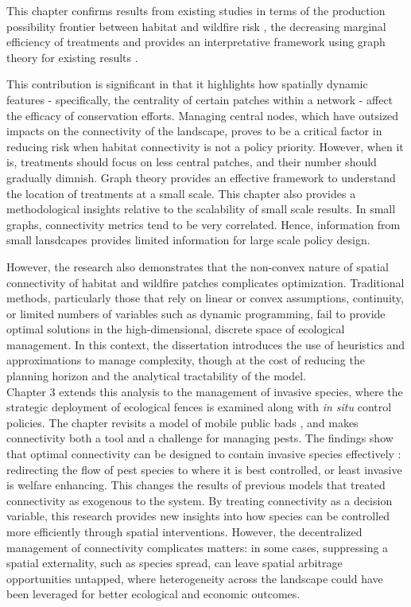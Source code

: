 This chapter confirms results from existing studies in terms of the production possibility frontier between habitat and wildfire risk \citep{calkin_modeling_2005}, the decreasing marginal efficiency of treatments \citep{wei_optimization_2008, yemshanov_exploring_2022} and provides an interpretative framework using graph theory for existing results \citep{minas_spatial_2014,
rachmawati_optimisation_2016,
konoshima_spatial-endogenous_2008, yemshanov_detecting_2021}. 

This contribution is significant in that it highlights how spatially dynamic features - specifically, the centrality of certain patches within a network - affect the efficacy of conservation efforts. Managing central nodes, which have outsized impacts on the connectivity of the landscape, proves to be a critical factor in reducing risk when habitat connectivity is not a policy priority. However, when it is, treatments should focus on less central patches, and their number should gradually dimnish. Graph theory provides an effective framework to understand the location of treatments at a small scale. This chapter also provides a methodological insights relative to the scalability of small scale results. In small graphs, connectivity metrics tend to be very correlated. Hence, information from small lansdcapes provides limited information for large scale policy design. 

However, the research also demonstrates that the non-convex nature of spatial connectivity of habitat and wildfire patches  complicates optimization. Traditional methods, particularly those that rely on linear or convex assumptions, continuity, or limited numbers of variables such as dynamic programming, fail to provide optimal solutions in the high-dimensional, discrete space of ecological management. In this context, the dissertation introduces the use of heuristics and approximations to manage complexity, though at the cost of reducing the planning horizon and the analytical tractability of the model.\\

Chapter 3 extends this analysis to the management of invasive species, where the strategic deployment of ecological fences is examined along with \textit{in situ} control policies. The chapter revisits a model of mobile public bads \citep{costello_private_2017}, and makes connectivity both a tool and a challenge for managing pests. The findings show that optimal connectivity can be designed to contain invasive species effectively : redirecting the flow of pest species to where it is best controlled, or least invasive is welfare enhancing. This changes the results of previous models \citep{costello_private_2017} that treated connectivity as exogenous to the system. By treating connectivity as a decision variable, this research provides new insights into how species can be controlled more efficiently through spatial interventions. However, the decentralized management of connectivity complicates matters: in some cases, suppressing a spatial externality, such as species spread, can leave spatial arbitrage opportunities untapped, where heterogeneity across the landscape could have been leveraged for better ecological and economic outcomes.

